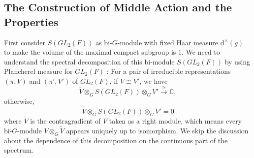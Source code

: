 \documentclass[12pt,a4paper,english]{article}
\theoremstyle{plain}
\theoremstyle{definition}
\begin{document}
\subsection{The Construction of Middle Action and the Properties}
First consider $S(GL_{2}(F))$ 
 as bi-$G$-module with fixed Haar measure $\text{d}^{\times}(g)$ to make the volume of the maximal compact subgroup is 1. We need to understand the spectral decomposition of this bi-module $S(GL_{2}(F))$ by using Plancherel measure for $GL_2(F)$ \cite{arthur1991local}:
 For a pair of irreducible representations $(\pi,V)$ and $(\pi',V')$ of $GL_{2}(F)$, if $V\cong V'$, we have  
 \begin{equation*}
\tilde{V}\otimes_{G}S(GL_{2}(F))\otimes_{G}V'\xrightarrow{\cong}\mathbb{C},
 \end{equation*}
otherwise,
\begin{equation*}
\tilde{V}\otimes_{G}S(GL_{2}(F))\otimes_{G}V'=0
\end{equation*}
where $\tilde{V}$ is the contragradient of $V$ taken as a right module, which means every bi-$G$-module $V\otimes_{G}\tilde{V}$ appears uniquely up to isomorphism. We skip the discussion about the dependence of this decomposition on the continuous part of the spectrum. 
\end{document}

